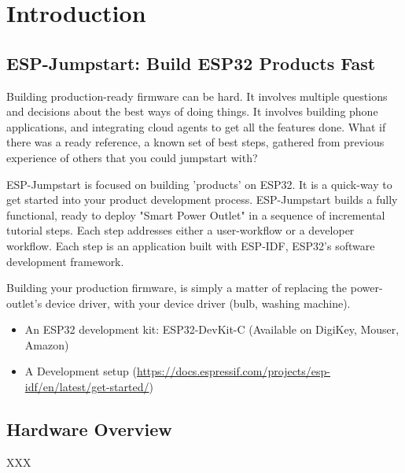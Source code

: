 \documentclass[main.tex]{subfiles}
\begin{document}
\chapter{Introduction}

\section{ESP-Jumpstart: Build ESP32 Products Fast}

Building production-ready firmware can be hard. It involves multiple questions and decisions about the best ways of doing things. It involves building phone applications, and integrating cloud agents to get all the features done. What if there was a ready reference, a known set of best steps, gathered from previous experience of others that you could jumpstart with?

ESP-Jumpstart is focused on building 'products' on ESP32. It is a quick-way to get started into your product development process. ESP-Jumpstart builds a fully functional, ready to deploy "Smart Power Outlet" in a sequence of incremental tutorial steps. Each step addresses either a user-workflow or a developer workflow. Each step is an application built with ESP-IDF, ESP32's software development framework.

Building your production firmware, is simply a matter of replacing the power-outlet's device driver, with your device driver (bulb, washing machine).


\begin{itemize}
\item An ESP32 development kit: ESP32-DevKit-C (Available on DigiKey, Mouser, Amazon)
\item A Development setup (\url{https://docs.espressif.com/projects/esp-idf/en/latest/get-started/})
\end{itemize}


\section{Hardware Overview}
XXX
\end{document}
